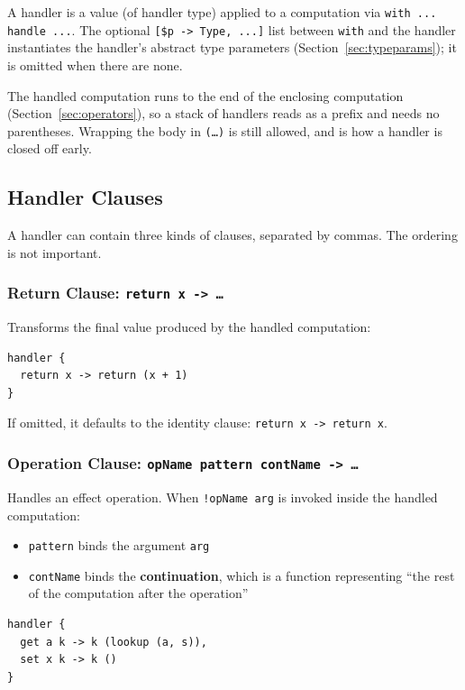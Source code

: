 \documentclass[11pt,a4paper]{article}
\newcommand{\cba}[1]{\lstinline[style=cbainline]{#1}}
\begin{document}
A handler is a value (of handler type) applied to a computation via
\cba{with ... handle ...}.  The optional \cba{[$p -> Type, ...]} list between
\cba{with} and the handler instantiates the handler's abstract type
parameters (Section~\ref{sec:typeparams}); it is omitted when there are none.

The handled computation runs to the end of the enclosing computation
(Section~\ref{sec:operators}), so a stack of handlers reads as a prefix and
needs no parentheses.  Wrapping the body in \texttt{(\ldots)} is still
allowed, and is how a handler is closed off early.

\subsection{Handler Clauses}

A handler can contain three kinds of clauses, separated by commas. The ordering is not important.

\subsubsection{Return Clause: \texttt{return x -> \ldots}}

Transforms the final value produced by the handled computation:

\begin{lstlisting}
handler {
  return x -> return (x + 1)
}
\end{lstlisting}

If omitted, it defaults to the identity clause: \cba{return x -> return x}.

\subsubsection{Operation Clause: \texttt{opName pattern contName -> \ldots}}

Handles an effect operation.  When \texttt{!opName arg} is invoked inside the
handled computation:

\begin{itemize}
  \item \texttt{pattern} binds the argument \texttt{arg}
  \item \texttt{contName} binds the \textbf{continuation}, which is a function
        representing ``the rest of the computation after the operation''
\end{itemize}

\begin{lstlisting}
handler {
  get a k -> k (lookup (a, s)),
  set x k -> k ()
}
\end{lstlisting}
\end{document}
